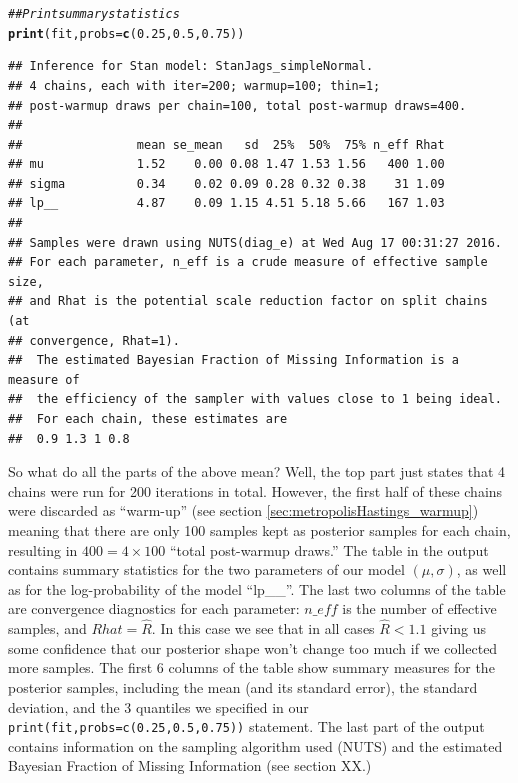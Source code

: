 \documentclass[11pt,fullpage]{book}
\makeatletter
\newenvironment{kframe}{%
	\def\at@end@of@kframe{}%
	\ifinner\ifhmode%
	\def\at@end@of@kframe{\end{minipage}}%
\begin{minipage}{\columnwidth}%
	\fi\fi%
	\def\FrameCommand##1{\hskip\@totalleftmargin \hskip-\fboxsep
		\colorbox{shadecolor}{##1}\hskip-\fboxsep
		\hskip-\linewidth \hskip-\@totalleftmargin \hskip\columnwidth}%
	\MakeFramed {\advance\hsize-\width
		\@totalleftmargin\z@ \linewidth\hsize
		\@setminipage}}%
{\par\unskip\endMakeFramed%
	\at@end@of@kframe}
\newcommand{\hlnum}[1]{\textcolor[rgb]{0.686,0.059,0.569}{#1}}%
\newcommand{\hlcom}[1]{\textcolor[rgb]{0.678,0.584,0.686}{\textit{#1}}}%
\newcommand{\hlstd}[1]{\textcolor[rgb]{0.345,0.345,0.345}{#1}}%
\newcommand{\hlkwc}[1]{\textcolor[rgb]{0.333,0.667,0.333}{#1}}%
\newcommand{\hlkwd}[1]{\textcolor[rgb]{0.737,0.353,0.396}{\textbf{#1}}}%
\newenvironment{knitrout}{}{} %
\makeatother
\begin{document}
\begin{knitrout}\small
		\color{fgcolor}\begin{kframe}
			\begin{alltt}
				\hlcom{## Print summary statistics}
				\hlkwd{print}\hlstd{(fit,}\hlkwc{probs} \hlstd{=} \hlkwd{c}\hlstd{(}\hlnum{0.25}\hlstd{,} \hlnum{0.5}\hlstd{,} \hlnum{0.75}\hlstd{))}
			\end{alltt}
			\begin{verbatim}
## Inference for Stan model: StanJags_simpleNormal.
## 4 chains, each with iter=200; warmup=100; thin=1; 
## post-warmup draws per chain=100, total post-warmup draws=400.
## 
##                mean se_mean   sd  25%  50%  75% n_eff Rhat
## mu             1.52    0.00 0.08 1.47 1.53 1.56   400 1.00
## sigma          0.34    0.02 0.09 0.28 0.32 0.38    31 1.09
## lp__           4.87    0.09 1.15 4.51 5.18 5.66   167 1.03
## 
## Samples were drawn using NUTS(diag_e) at Wed Aug 17 00:31:27 2016.
## For each parameter, n_eff is a crude measure of effective sample size,
## and Rhat is the potential scale reduction factor on split chains (at 
## convergence, Rhat=1).
##  The estimated Bayesian Fraction of Missing Information is a measure of
##  the efficiency of the sampler with values close to 1 being ideal.
##  For each chain, these estimates are
##  0.9 1.3 1 0.8
			\end{verbatim}
		\end{kframe}
	\end{knitrout}

So what do all the parts of the above mean? Well, the top part just states that 4 chains were run for 200 iterations in total. However, the first half of these chains were discarded as ``warm-up'' (see section \ref{sec:metropolisHastings_warmup}) meaning that there are only 100 samples kept as posterior samples for each chain, resulting in $400=4\times 100$ ``total post-warmup draws.'' The table in the output contains summary statistics for the two parameters of our model $(\mu,\sigma)$, as well as for the log-probability of the model ``lp\_\_''. The last two columns of the table are convergence diagnostics for each parameter: $n\_eff$ is the number of effective samples, and $Rhat = \hat{R}$. In this case we see that in all cases $\hat{R}<1.1$ giving us some confidence that our posterior shape won't change too much if we collected more samples. The first 6 columns of the table show summary measures for the posterior samples, including the mean (and its  standard error), the standard deviation, and the 3 quantiles we specified in our \texttt{print(fit,probs=c(0.25,0.5,0.75))} statement. The last part of the output contains information on the sampling algorithm used (NUTS) and the estimated Bayesian Fraction of Missing Information (see section XX.)
\end{document}
